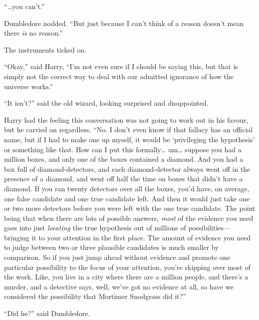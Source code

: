 ``\ldots{}you can't.''

Dumbledore nodded. ``But just because I can't think of a reason doesn't
mean there \emph{is} no reason.''

The instruments ticked on.

``Okay,'' said Harry, ``I'm not even sure if I should be saying this,
but that is simply not the correct way to deal with our admitted
ignorance of how the universe works.''

``It isn't?'' said the old wizard, looking surprised and disappointed.

Harry had the feeling this conversation was not going to work out in his
favour, but he carried on regardless. ``No. I don't even know if that
fallacy has an official name, but if I had to make one up myself, it
would be `privileging the hypothesis' or something like that. How can I
put this formally\ldots{} um\ldots{} suppose you had a million boxes,
and only one of the boxes contained a diamond. And you had a box full of
diamond-detectors, and each diamond-detector always went off in the
presence of a diamond, and went off half the time on boxes that didn't
have a diamond. If you ran twenty detectors over all the boxes, you'd
have, on average, one false candidate and one true candidate left. And
then it would just take one or two more detectors before you were left
with the one true candidate. The point being that when there are lots of
possible answers, \emph{most} of the evidence you need goes into just
\emph{locating} the true hypothesis out of millions of
possibilities---bringing it to your attention in the first place. The
amount of evidence you need to judge between two or three plausible
candidates is much smaller by comparison. So if you just jump ahead
without evidence and promote one particular possibility to the focus of
your attention, you're skipping over most of the work. Like, you live in
a city where there are a million people, and there's a murder, and a
detective says, well, we've got no evidence at all, so have we
considered the possibility that Mortimer Snodgrass did it?''

``Did he?'' said Dumbledore.

